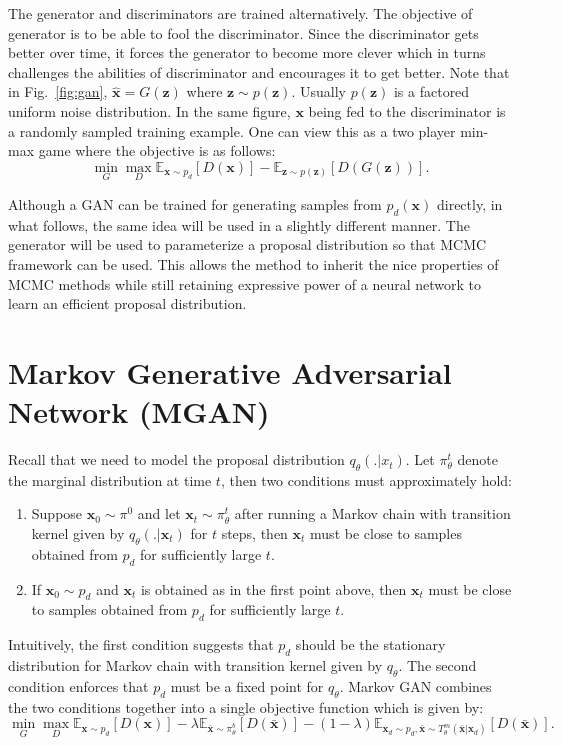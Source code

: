\documentclass[letterpaper,english,10pt]{article}
\begin{document}
The generator and discriminators are trained alternatively. The objective of generator is to be able to fool the discriminator. Since the discriminator gets better over time, it forces the generator to become more clever which in turns challenges the abilities of discriminator and encourages it to get better. Note that in Fig.~\ref{fig:gan}, $\hat{\mathbf{x}} = G(\mathbf{z})$ where $\mathbf{z} \sim p(\mathbf{z})$. Usually $p(\mathbf{z})$ is a factored uniform noise distribution. In the same figure, $\mathbf{x}$ being fed to the discriminator is a randomly sampled training example. One can view this as a two player min-max game where the objective is as follows:
$$\min_G \max_D \mathbb{E}_{\mathbf{x} \sim p_d}[D(\mathbf{x})] - \mathbb{E}_{\mathbf{z} \sim p(\mathbf{z})}[D(G(\mathbf{z}))].$$

Although a GAN can be trained for generating samples from $p_d(\mathbf{x})$ directly, in what follows, the same idea will be used in a slightly different manner. The generator will be used to parameterize a proposal distribution so that MCMC framework can be used. This allows the method to inherit the nice properties of MCMC methods while still retaining expressive power of a neural network to learn an efficient proposal distribution.

\section{Markov Generative Adversarial Network (MGAN)}
Recall that we need to model the proposal distribution $q_\theta(. | x_t)$. Let $\pi_\theta^t$ denote the marginal distribution at time $t$, then two conditions must approximately hold:
\begin{enumerate}
    \item Suppose $\mathbf{x}_0 \sim \pi^0$ and let $\mathbf{x}_t \sim \pi_\theta^t$ after running a Markov chain with transition kernel given by $q_\theta(.|\mathbf{x}_t)$ for $t$ steps, then $\mathbf{x}_t$ must be close to samples obtained from $p_d$ for sufficiently large $t$.
    \item If $\mathbf{x}_0 \sim p_d$ and $\mathbf{x}_t$ is obtained as in the first point above, then $\mathbf{x}_t$ must be close to samples obtained from $p_d$ for sufficiently large $t$.
\end{enumerate}

Intuitively, the first condition suggests that $p_d$ should be the stationary distribution for Markov chain with transition kernel given by $q_\theta$. The second condition enforces that $p_d$ must be a fixed point for $q_\theta$. Markov GAN combines the two conditions together into a single objective function which is given by:
$$\min_G \max_D \mathbb{E}_{\mathbf{x} \sim p_d}[D(\mathbf{x})] - \lambda\mathbb{E}_{\bar{\mathbf{x}} \sim \pi_\theta^b}[D(\bar{\mathbf{x}})]  - (1 - \lambda) \mathbb{E}_{\mathbf{x}_d \sim p_d, \bar{\mathbf{x}} \sim T_\theta^m(\bar{\mathbf{x}} | \mathbf{x}_d)}[D(\bar{\mathbf{x}})].$$
\end{document}
